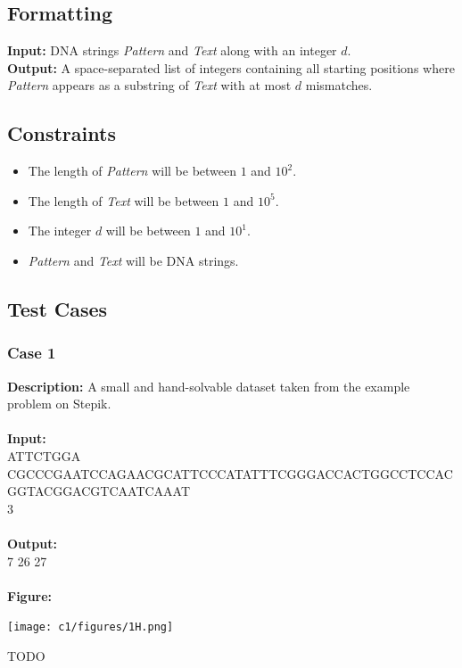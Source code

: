 \documentclass{article}
\newcommand{\code}[1]{{\fontfamily{pcr}\selectfont #1}}
\begin{document}
\subsection*{Formatting}
\textbf{Input:} DNA strings \emph{Pattern} and \emph{Text} along with an integer $d$.\\
\noindent \textbf{Output:} A space-separated list of integers containing all starting positions where \emph{Pattern} appears as a substring of \emph{Text} with at most $d$ mismatches.

\subsection*{Constraints}
\begin{itemize}
    \item The length of \emph{Pattern} will be between $1$ and $10^2$.
    \item The length of \emph{Text} will be between $1$ and $10^5$.
    \item The integer $d$ will be between $1$ and $10^1$.
    \item \emph{Pattern} and \emph{Text} will be DNA strings.
\end{itemize}
\pagebreak

\subsection*{Test Cases}
\subsubsection*{Case 1}
\hline \vspace{5}
\textbf{Description:} A small and hand-solvable dataset taken from the example problem on Stepik.\\ \\
\noindent \textbf{Input:}\\
\code{
ATTCTGGA \\
CGCCCGAATCCAGAACGCATTCCCATATTTCGGGACCACTGGCCTCCACGGTACGGACGTCAATCAAAT \\
3
}\\ \\
\noindent \textbf{Output:}\\
\code{
6 7 26 27
}\\ \\
\noindent \textbf{Figure:}
\begin{center}
    \texttt{[image: c1/figures/1H.png]}
\end{center}
\noindent TODO
\pagebreak
\end{document}
